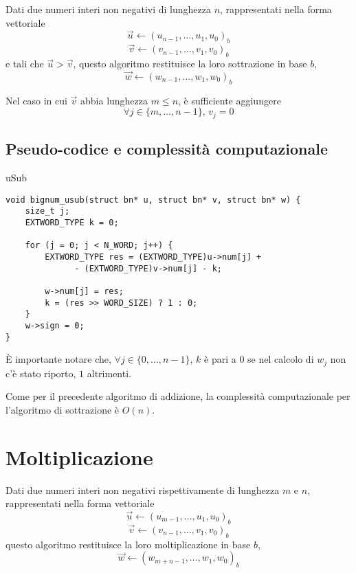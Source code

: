 Dati due numeri interi non negativi di lunghezza $n$, rappresentati nella forma vettoriale
$$\vec{u} \gets \left(u_{n-1}, \dots, u_1, u_0\right)_b$$
$$\vec{v} \gets \left(v_{n-1}, \dots, v_1, v_0\right)_b$$
e tali che $\vec{u} > \vec{v}$, questo algoritmo restituisce la loro sottrazione in base $b$,
$$\vec{w} \gets \left(w_{n-1}, \dots, w_1, w_0\right)_b$$
	
Nel caso in cui $\vec{v}$ abbia lunghezza $m \leq n$, è sufficiente aggiungere
$$\forall j \in \{m, \dots, n-1\} \mbox{, } v_j = 0$$

%
\subsection{Pseudo-codice e complessità computazionale}
%

\begin{algorithm}[H]
	\caption{uSub}
	\label{alg:uSub}
	\DontPrintSemicolon
\end{algorithm}

\begin{lstlisting}[basicstyle=\ttfamily\small, backgroundcolor=\color{bgCode}]
void bignum_usub(struct bn* u, struct bn* v, struct bn* w) {
    size_t j;
    EXTWORD_TYPE k = 0;
    
    for (j = 0; j < N_WORD; j++) {
        EXTWORD_TYPE res = (EXTWORD_TYPE)u->num[j] + 
              - (EXTWORD_TYPE)v->num[j] - k;
        
        w->num[j] = res;
        k = (res >> WORD_SIZE) ? 1 : 0;
    }
    w->sign = 0;
}
\end{lstlisting}

È importante notare che, $\forall j \in \{0, \dots, n-1\}$, $k$ è pari a $0$ se nel calcolo di $w_j$ non c'è stato riporto, $1$ altrimenti.

Come per il precedente algoritmo di addizione, la complessità computazionale per l'algoritmo di sottrazione è $O(n)$.
\clearpage

%
%
\section{Moltiplicazione}
%
%

Dati due numeri interi non negativi rispettivamente di lunghezza $m$ e $n$, rappresentati nella forma vettoriale
$$\vec{u} \gets \left(u_{m-1}, \dots, u_1, u_0\right)_b$$
$$\vec{v} \gets \left(v_{n-1}, \dots, v_1, v_0\right)_b$$
questo algoritmo restituisce la loro moltiplicazione in base $b$,
$$\vec{w} \gets \left(w_{m+n-1}, \dots, w_1, w_0\right)_b$$

